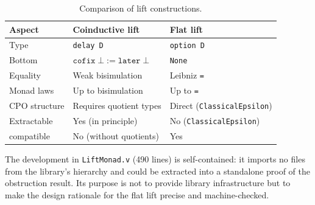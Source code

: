\begin{table}[ht]
\centering
\caption{Comparison of lift constructions.}
\label{tab:lift-comparison}
\small
\begin{tabular}{@{}l l l@{}}
\toprule
\textbf{Aspect} & \textbf{Coinductive lift} & \textbf{Flat lift} \\
\midrule
Type              & \texttt{delay D}
                  & \texttt{option D} \\
Bottom            & $\texttt{cofix}\;\bot := \texttt{later}\;\bot$
                  & \texttt{None} \\
Equality          & Weak bisimulation
                  & Leibniz \texttt{=} \\
Monad laws        & Up to bisimulation
                  & Up to \texttt{=} \\
CPO structure     & Requires quotient types
                  & Direct (\texttt{ClassicalEpsilon}) \\
Extractable       & Yes (in principle)
                  & No (\texttt{ClassicalEpsilon}) \\
\HB{} compatible  & No (without quotients)
                  & Yes \\
\bottomrule
\end{tabular}
\end{table}

\noindent
The development in \texttt{LiftMonad.v} (490 lines) is
self-contained: it imports no files from the library's hierarchy and
could be extracted into a standalone proof of the obstruction
result.
Its purpose is not to provide library infrastructure but to make the
design rationale for the flat lift precise and machine-checked.
